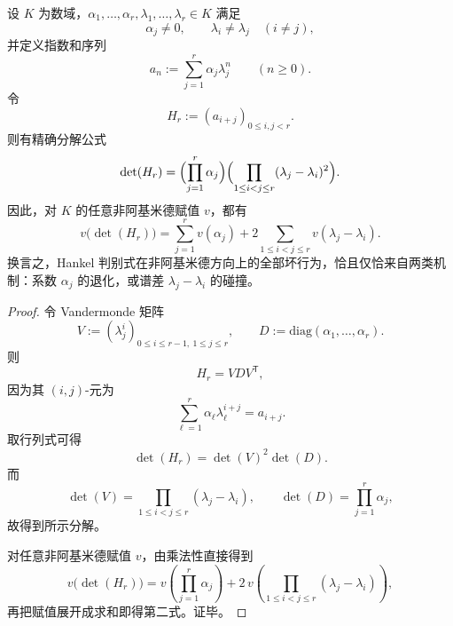 \begin{theorem}\label{thm:gut-hankel-vandermonde-discriminant-stiffness}
设 \(K\) 为数域，\(\alpha_1,\dots,\alpha_r,\lambda_1,\dots,\lambda_r\in K\) 满足
\[
\alpha_j\neq 0,
\qquad
\lambda_i\neq \lambda_j\quad(i\neq j),
\]
并定义指数和序列
\[
a_n:=\sum_{j=1}^{r}\alpha_j\lambda_j^n
\qquad(n\ge 0).
\]
令
\[
H_r:=(a_{i+j})_{0\le i,j<r}.
\]
则有精确分解公式
\[
\det(H_r)
=
\Bigl(\prod_{j=1}^{r}\alpha_j\Bigr)
\Bigl(\prod_{1\le i<j\le r}(\lambda_j-\lambda_i)^2\Bigr).
\]
因此，对 \(K\) 的任意非阿基米德赋值 \(v\)，都有
\[
v\!\bigl(\det(H_r)\bigr)
=
\sum_{j=1}^{r}v(\alpha_j)
+
2\sum_{1\le i<j\le r}v(\lambda_j-\lambda_i).
\]
换言之，Hankel 判别式在非阿基米德方向上的全部坏行为，恰且仅恰来自两类机制：系数 \(\alpha_j\) 的退化，或谱差 \(\lambda_j-\lambda_i\) 的碰撞。
\end{theorem}
\begin{proof}
令 Vandermonde 矩阵
\[
V:=(\lambda_j^i)_{0\le i\le r-1,\ 1\le j\le r},
\qquad
D:=\mathrm{diag}(\alpha_1,\dots,\alpha_r).
\]
则
\[
H_r=VDV^{\mathsf T},
\]
因为其 \((i,j)\)-元为
\[
\sum_{\ell=1}^{r}\alpha_\ell\lambda_\ell^{i+j}=a_{i+j}.
\]
取行列式可得
\[
\det(H_r)=\det(V)^2\det(D).
\]
而
\[
\det(V)=\prod_{1\le i<j\le r}(\lambda_j-\lambda_i),
\qquad
\det(D)=\prod_{j=1}^{r}\alpha_j,
\]
故得到所示分解。

对任意非阿基米德赋值 \(v\)，由乘法性直接得到
\[
v\!\bigl(\det(H_r)\bigr)
=
v\!\left(\prod_{j=1}^{r}\alpha_j\right)
+
2\,v\!\left(\prod_{1\le i<j\le r}(\lambda_j-\lambda_i)\right),
\]
再把赋值展开成求和即得第二式。证毕。
\end{proof}

